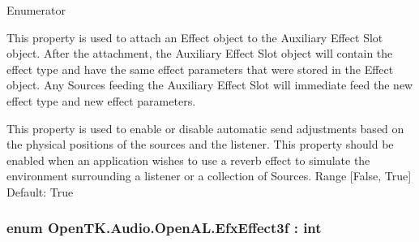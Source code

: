 \begin{Desc}
\item[Enumerator]\par
\begin{description}
\item[{\em 
\hypertarget{namespace_open_t_k_1_1_audio_1_1_open_a_l_a94243a598006983d92449b374a5b60cca5c7490bcd2d8c9434c85a3d3c6eb8600}{Effectslot\-Effect}\label{namespace_open_t_k_1_1_audio_1_1_open_a_l_a94243a598006983d92449b374a5b60cca5c7490bcd2d8c9434c85a3d3c6eb8600}
}]This property is used to attach an Effect object to the Auxiliary Effect Slot object. After the attachment, the Auxiliary Effect Slot object will contain the effect type and have the same effect parameters that were stored in the Effect object. Any Sources feeding the Auxiliary Effect Slot will immediate feed the new effect type and new effect parameters.\item[{\em 
\hypertarget{namespace_open_t_k_1_1_audio_1_1_open_a_l_a94243a598006983d92449b374a5b60cca02f02571c0ee8d3081054750a54ea98d}{Effectslot\-Auxiliary\-Send\-Auto}\label{namespace_open_t_k_1_1_audio_1_1_open_a_l_a94243a598006983d92449b374a5b60cca02f02571c0ee8d3081054750a54ea98d}
}]This property is used to enable or disable automatic send adjustments based on the physical positions of the sources and the listener. This property should be enabled when an application wishes to use a reverb effect to simulate the environment surrounding a listener or a collection of Sources. Range \mbox{[}False, True\mbox{]} Default\-: True \end{description}
\end{Desc}
\hypertarget{namespace_open_t_k_1_1_audio_1_1_open_a_l_a1c69083823578d237ab570da681a5cfa}{
\subsubsection[{Efx\-Effect3f}]{\setlength{\rightskip}{0pt plus 5cm}enum {\bf Open\-T\-K.\-Audio.\-Open\-A\-L.\-Efx\-Effect3f} \-: int}}\label{namespace_open_t_k_1_1_audio_1_1_open_a_l_a1c69083823578d237ab570da681a5cfa}


